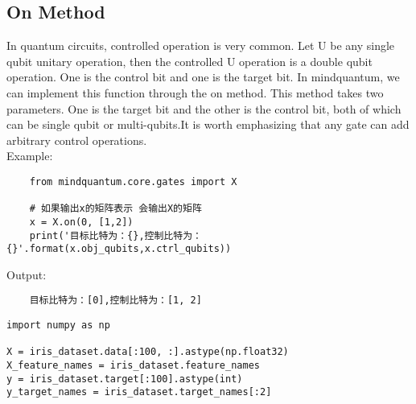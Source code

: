 \subsection{On Method}
In quantum circuits, controlled operation is very common. Let U be any single qubit unitary operation, then the controlled U operation is a double qubit operation. One is the control bit and one is the target bit. In mindquantum, we can implement this function through the on method. This method takes two parameters. One is the target bit and the other is the control bit, both of which can be single qubit or multi-qubits.It is worth emphasizing that any gate can add arbitrary control operations.\\
Example:
\begin{lstlisting}
    from mindquantum.core.gates import X

    # 如果输出x的矩阵表示 会输出X的矩阵
    x = X.on(0, [1,2])
    print('目标比特为：{},控制比特为：{}'.format(x.obj_qubits,x.ctrl_qubits))
\end{lstlisting}
Output:
\begin{lstlisting}
    目标比特为：[0],控制比特为：[1, 2]
\end{lstlisting}
\begin{lstlisting}
import numpy as np     

X = iris_dataset.data[:100, :].astype(np.float32)
X_feature_names = iris_dataset.feature_names
y = iris_dataset.target[:100].astype(int)
y_target_names = iris_dataset.target_names[:2] 
\end{lstlisting}

